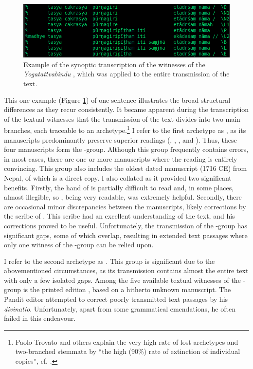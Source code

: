   \begin{figure}[!ht]
    \centering
    \includegraphics[width=1\textwidth]{pics/synoptic1.png} %
    \caption{Example of the synoptic transcription of the witnesses of the \emph{Yogatattvabindu} , which was applied to the entire transmission of the text.}
    \label{fig:synoptic1}
\end{figure}

This one example (Figure \ref{fig:synoptic1}) of one sentence illustrates the broad structural differences as they recur consistently. It became apparent during the transcription of the textual witnesses that the transmission of the text divides into two main branches, each traceable to an archetype.\footnote{Paolo Trovato and others explain the very high rate of lost archetypes and two-branched stemmata by ``the high (90\%) rate of extinction of individual copies'', cf. \citeauthor[2017: 86]{trovato2017}.}
  I refer to the first archetype as \alpha, as its manuscripts predominantly preserve superior readings (, , , and ). Thus, these four manuscripts form the \alpha-group. Although this group frequently contains errors, in most cases, there are one or more manuscripts where the reading is entirely convincing. This group also includes the oldest dated manuscript  (1716 CE) from Nepal, of which  is a direct copy. I also collated  as it provided two significant benefits. Firstly, the hand of  is partially difficult to read and, in some places, almost illegible, so , being very readable, was extremely helpful. Secondly, there are occasional minor discrepancies between the manuscripts, likely corrections by the scribe of . This scribe had an excellent understanding of the text, and his corrections proved to be useful. Unfortunately, the transmission of the \alpha-group has significant gaps, some of which overlap, resulting in extended text passages where only one witness of the \alpha-group can be relied upon.
  
  I refer to the second archetype as \beta. This group is significant due to the abovementioned circumstances, as its transmission contains almost the entire text with only a few isolated gaps. Among the five available textual witnesses of the \beta-group is the printed edition , based on a hitherto unknown manuscript. The Pandit editor attempted to correct poorly transmitted text passages by his \textit{divinatio}. Unfortunately, apart from some grammatical emendations, he often failed in this endeavour.
  
